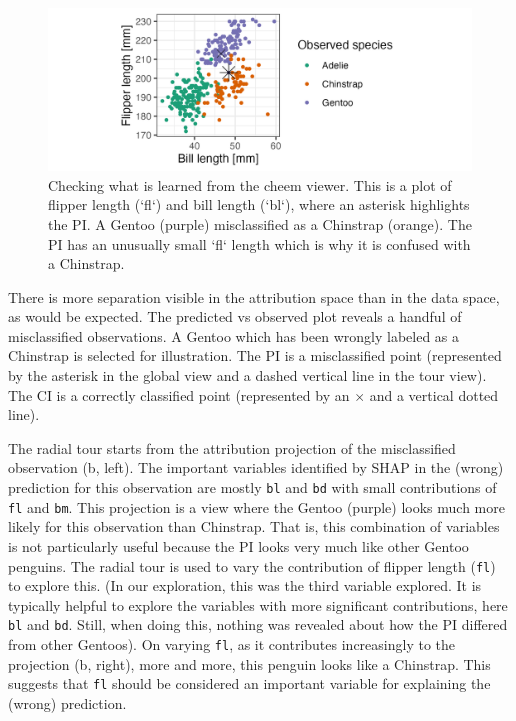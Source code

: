 \documentclass[
]{jss}
\begin{document}
\begin{CodeChunk}
\begin{figure}

{\centering \includegraphics[width=1\linewidth]{./figures/case_penguins_BlFl} 

}

\caption[Checking what is learned from the cheem viewer]{Checking what is learned from the cheem viewer. This is a plot of flipper length (`fl`) and bill length (`bl`), where an asterisk highlights the PI. A Gentoo (purple) misclassified as a Chinstrap (orange). The PI has an unusually small `fl` length which is why it is confused with a Chinstrap.}\label{fig:casepenguinsblfl}
\end{figure}
\end{CodeChunk}

There is more separation visible in the attribution space than in the
data space, as would be expected. The predicted vs observed plot reveals
a handful of misclassified observations. A Gentoo which has been wrongly
labeled as a Chinstrap is selected for illustration. The PI is a
misclassified point (represented by the asterisk in the global view and
a dashed vertical line in the tour view). The CI is a correctly
classified point (represented by an \(\times\) and a vertical dotted
line).

The radial tour starts from the attribution projection of the
misclassified observation (b, left). The important variables identified
by SHAP in the (wrong) prediction for this observation are mostly
\texttt{bl} and \texttt{bd} with small contributions of \texttt{fl} and
\texttt{bm}. This projection is a view where the Gentoo (purple) looks
much more likely for this observation than Chinstrap. That is, this
combination of variables is not particularly useful because the PI looks
very much like other Gentoo penguins. The radial tour is used to vary
the contribution of flipper length (\texttt{fl}) to explore this. (In
our exploration, this was the third variable explored. It is typically
helpful to explore the variables with more significant contributions,
here \texttt{bl} and \texttt{bd}. Still, when doing this, nothing was
revealed about how the PI differed from other Gentoos). On varying
\texttt{fl}, as it contributes increasingly to the projection (b,
right), more and more, this penguin looks like a Chinstrap. This
suggests that \texttt{fl} should be considered an important variable for
explaining the (wrong) prediction.
\end{document}
